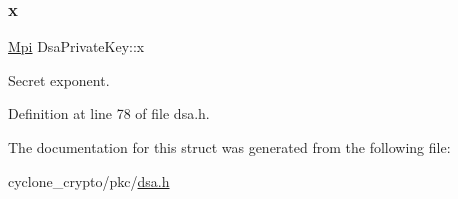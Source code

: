 \subsubsection{\texorpdfstring{x}{x}}
{\footnotesize\ttfamily \hyperlink{structMpi}{Mpi} Dsa\+Private\+Key\+::x}



Secret exponent. 



Definition at line 78 of file dsa.\+h.



The documentation for this struct was generated from the following file\+:\begin{DoxyCompactItemize}
\item 
cyclone\+\_\+crypto/pkc/\hyperlink{dsa_8h}{dsa.\+h}\end{DoxyCompactItemize}
